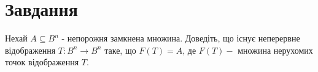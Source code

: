 
\chapter{Завдання \theHchapter}

\begin{tcolorbox}[title=Завдання]
    Нехай $A \subseteq B^{n}$ - непорожня замкнена множина. 
    Доведіть, що існує неперервне відображення 
    $T: B^{n} \rightarrow B^{n}$ таке, що $F(T)=A$, 
    де $F(T)-$ множина нерухомих точок відображення $T$.
\end{tcolorbox}



